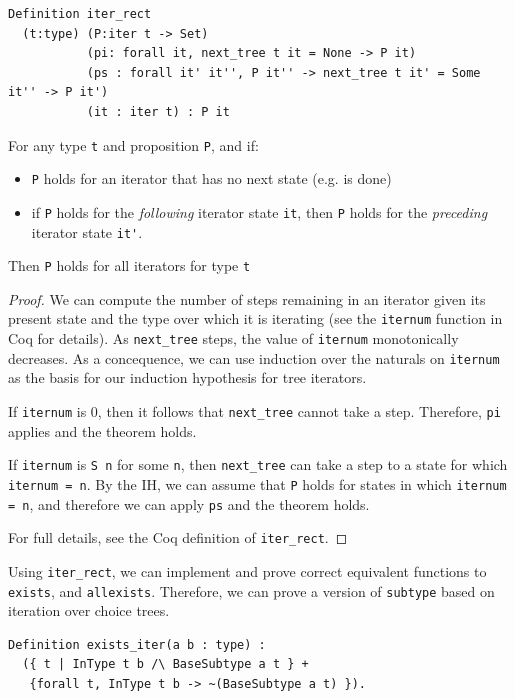 \documentclass[a4paper,english]{lipics-v2019}
\begin{document}
\begin{theorem}
\begin{small}\begin{verbatim}
Definition iter_rect
  (t:type) (P:iter t -> Set)
           (pi: forall it, next_tree t it = None -> P it)
           (ps : forall it' it'', P it'' -> next_tree t it' = Some it'' -> P it')
           (it : iter t) : P it  
\end{verbatim}\end{small}

For any type \verb|t| and proposition \verb|P|, and if:
\begin{itemize} 
	\item \verb|P| holds for an iterator that has no next state (e.g. is done)
	\item if \verb|P| holds for the \emph{following} iterator state \verb|it|,
	then \verb|P| holds for the \emph{preceding} iterator state \verb|it'|.
\end{itemize}
Then \verb|P| holds for all iterators for type \verb|t|
\end{theorem}
\begin{proof}
We can compute the number of steps remaining in an iterator given its present state
and the type over which it is iterating (see the \verb|iternum| function in Coq for
details). As \verb|next_tree| steps, the value of \verb|iternum| monotonically decreases.
As a concequence, we can use induction over the naturals on \verb|iternum| as the basis
for our induction hypothesis for tree iterators.

If \verb|iternum| is 0, then it follows that \verb|next_tree| cannot take a step. Therefore,
\verb|pi| applies and the theorem holds.

If \verb|iternum| is \verb|S n| for some \verb|n|, then \verb|next_tree| can take a step to a state for which
\verb|iternum = n|. By the IH, we can assume that \verb|P| holds for states in which \verb|iternum = n|, 
and therefore we can apply \verb|ps| and the theorem holds.

For full details, see the Coq definition of \verb|iter_rect|.
\end{proof}

Using \verb|iter_rect|, we can implement and prove correct equivalent functions
to \verb|exists|, and \verb|allexists|. Therefore, we can prove a version of \verb|subtype|
based on iteration over choice trees.
\begin{small}\begin{verbatim}
Definition exists_iter(a b : type) : 
  ({ t | InType t b /\ BaseSubtype a t } +
   {forall t, InType t b -> ~(BaseSubtype a t) }).
\end{verbatim}\end{small}
\end{document}
